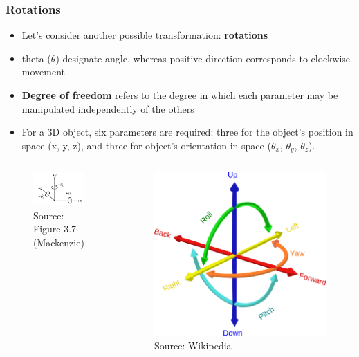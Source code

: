 \documentclass{beamer}
\begin{document}
\begin{frame}
	\frametitle{Rotations}
	\begin{itemize}
		\item Let's consider another possible transformation: \textbf{rotations}
		\item theta ($\theta$) designate angle, whereas positive direction corresponds to clockwise movement
		\item \textbf{Degree of freedom} refers to the degree in which each parameter may be manipulated independently of the others
		\item For a 3D object, six parameters are required: three for the object's position in space (x, y, z), and three for object's orientation in space ($\theta_{x}$, $\theta_{y}$, $\theta_{z}$).  
	\end{itemize}
	\begin{columns}[c]		
		\begin{figure}
			\includegraphics[width=0.6\linewidth]{image/3-7}
			\caption{Source: Figure 3.7 (Mackenzie)}
		\end{figure}
		\begin{figure}
			\includegraphics[width=0.4\linewidth]{image/dof}
			\caption{Source: Wikipedia}
		\end{figure}
	\end{columns}

\end{frame}
\end{document}
